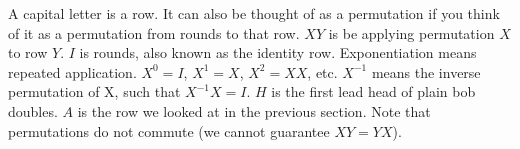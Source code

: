 \documentclass[preview]{standalone}
\begin{document}
\begin{flushleft}
A capital letter is a row. It can also be thought of as a permutation if you think of it as a permutation from rounds to that row. $XY$ is be applying permutation $X$ to row $Y$. $I$ is rounds, also known as the identity row. Exponentiation means repeated application. $X^0=I$, $X^1=X$, $X^2=XX$, etc. $X^{-1}$ means the inverse permutation of X, such that $X^{-1}X=I$. $H$ is the first lead head of plain bob doubles. $A$ is the row we looked at in the previous section. Note that permutations do not commute (we cannot guarantee $XY=YX$).
\end{flushleft}
\end{document}
